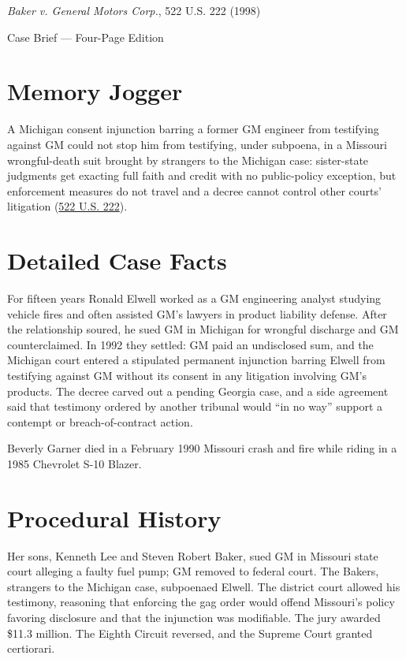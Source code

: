 \documentclass[12pt]{article}
\begin{document}
\begin{center}
{\LARGE \textit{Baker v. General Motors Corp.}, 522 U.S. 222 (1998)\par}
\vspace{0.8em}
{\large Case Brief --- Four-Page Edition\par}
\end{center}
\vspace{1em}

\section{Memory Jogger}

A Michigan consent injunction barring a former GM engineer from testifying against GM could not stop him from testifying, under subpoena, in a Missouri wrongful-death suit brought by strangers to the Michigan case: sister-state judgments get exacting full faith and credit with no public-policy exception, but enforcement measures do not travel and a decree cannot control other courts' litigation (\href{https://supreme.justia.com/cases/federal/us/522/222/}{522 U.S. 222}).

\section{Detailed Case Facts}

For fifteen years Ronald Elwell worked as a GM engineering analyst studying vehicle fires and often assisted GM's lawyers in product liability defense. After the relationship soured, he sued GM in Michigan for wrongful discharge and GM counterclaimed. In 1992 they settled: GM paid an undisclosed sum, and the Michigan court entered a stipulated permanent injunction barring Elwell from testifying against GM without its consent in any litigation involving GM's products. The decree carved out a pending Georgia case, and a side agreement said that testimony ordered by another tribunal would ``in no way'' support a contempt or breach-of-contract action.

Beverly Garner died in a February 1990 Missouri crash and fire while riding in a 1985 Chevrolet S-10 Blazer.

\section{Procedural History}

Her sons, Kenneth Lee and Steven Robert Baker, sued GM in Missouri state court alleging a faulty fuel pump; GM removed to federal court. The Bakers, strangers to the Michigan case, subpoenaed Elwell. The district court allowed his testimony, reasoning that enforcing the gag order would offend Missouri's policy favoring disclosure and that the injunction was modifiable. The jury awarded \$11.3 million. The Eighth Circuit reversed, and the Supreme Court granted certiorari.
\end{document}
